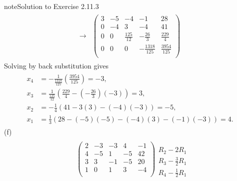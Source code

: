 \documentclass[letterpaper,10pt,english]{jupyterBook}
\begin{document}
\begin{sphinxadmonition}{note}{Solution to Exercise 2.11.3}
\begin{equation*}
\begin{split}
\begin{align*}
    \longrightarrow 
    & \left( \begin{array}{cccc|c} 
         3 & -5 & -4 & -1 & 28 \\ 
         0 & -4 & 3 & -4 & 41 \\ 
         0 & 0 & \frac{125}{12} & - \frac{26}{3} & \frac{229}{4} \\ 
         0 & 0 & 0 & - \frac{1318}{125} & \frac{3954}{125} \\ 
    \end{array} \right) 
\end{align*} \end{split}
\end{equation*}
\sphinxAtStartPar
Solving by back substitution gives
\begin{equation*}
\begin{split} \begin{align*} 
    x_{4} &=  - \frac{1}{\frac{1318}{125}} \left( \frac{3954}{125} \right) = -3, \\ 
    x_{3} &=  \frac{1}{\frac{125}{12}} \left( \frac{229}{4} - \left( - \frac{26}{3} \right) \left( -3 \right) \right) = 3, \\ 
    x_{2} &=  - \frac{1}{4} \left( 41 - 3 \left( 3 \right) - \left( -4 \right) \left( -3 \right) \right) = -5, \\ 
    x_{1} &=  \frac{1}{3} \left( 28 - \left( -5 \right) \left( -5 \right) - \left( -4 \right) \left( 3 \right) - \left( -1 \right) \left( -3 \right) \right) = 4. 
\end{align*} \end{split}
\end{equation*}
\sphinxAtStartPar
(f)
\begin{equation*}
\begin{split} \begin{align*} 
    & \left( \begin{array}{cccc|c} 
         2 & -3 & -3 & 4 & -1 \\ 
         4 & -5 & 1 & -5 & 42 \\ 
         3 & 3 & -1 & -5 & 20 \\ 
         1 & 0 & 1 & 3 & -4 \\ 
    \end{array} \right) 
    \begin{array}{l} \phantom{x} \\ R_{2} - 2 R_{1} \\ R_{3} - \frac{3}{2} R_{1} \\ R_{4} - \frac{1}{2} R_{1} \end{array} \\ \\ 

\end{align*}
\end{split}
\end{equation*}
\end{sphinxadmonition}
\end{document}
